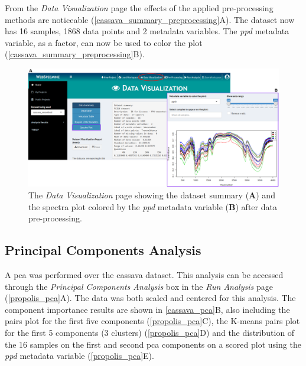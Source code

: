 From the \textit{Data Visualization} page the effects of the applied pre-processing methods are noticeable (\autoref{cassava_summary_preprocessing}A). The dataset now has 16 samples, 1868 data points and 2 metadata variables. The \textit{ppd} metadata variable, as a factor, can now be used to color the plot (\autoref{cassava_summary_preprocessing}B).

\begin{figure}[H]
	\centering
	\includegraphics[width=1\linewidth]{Imagens/CassavaPPD/data_overview_preproc}
	\caption{The \textit{Data Visualization} page showing the dataset summary (\textbf{A}) and the spectra plot colored by the \textit{ppd} metadata variable (\textbf{B}) after data pre-processing.}
	\label{cassava_summary_preprocessing}
\end{figure}


\subsection{Principal Components Analysis}

A \gls{pca} was performed over the cassava dataset. This analysis can be accessed through the \textit{Principal Components Analysis} box in the \textit{Run Analysis} page (\autoref{propolis_pca}A). The data was both scaled and centered for this analysis. The component importance results are shown in \autoref{cassava_pca}B, also including the pairs plot for the first five components (\autoref{propolis_pca}C), the K-means pairs plot for the first 5 components (3 clusters) (\autoref{propolis_pca}D) and the distribution of the 16 samples on the first and second \gls{pca} components on a scored plot using the \textit{ppd} metadata variable (\autoref{propolis_pca}E). 


